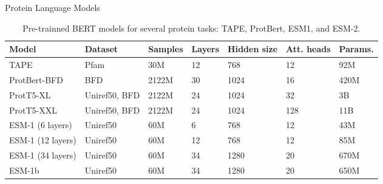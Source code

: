 \documentclass[10pt]{beamer}
\newcommand{\1}{
	\setbeamertemplate{background}{
		\texttt{[image: ../img/1]}
		\tikz[overlay] \fill[fill opacity=0.75,fill=white] (0,0) rectangle (-\paperwidth,\paperheight);
	}
}
\begin{document}
\begin{frame}{Protein Language Models}{}	
	\begin{table}[h]%
		\centering
		\scriptsize
		\caption{Pre-trainned BERT models for several protein tasks: TAPE, ProtBert, ESM1, and ESM-2.}%
		
		\label{tab:pretrained}
		
		\setlength{\tabcolsep}{0.5em} %
		{\renewcommand{\arraystretch}{1.1}%
			\scriptsize
			\begin{tabular}{lllllll}
				
				\textbf{Model}   & \textbf{Dataset} & \textbf{Samples} & \textbf{Layers} & \textbf{Hidden size} & \textbf{Att. heads} & \textbf{Params.} \\ \hline
				
				TAPE             & Pfam             & 30M                   & 12              & 768                  & 12                       & 92M                 \\
				ProtBert-BFD     & BFD              & 2122M                 & 30              & 1024                 & 16                       & 420M                \\
				
				ProtT5-XL     & Uniref50, BFD              & 2122M                 & 24              & 1024                 & 32                       & 3B                \\
				
				ProtT5-XXL     & Uniref50, BFD              & 2122M                 & 24              & 1024                 & 128                       & 11B                \\
				
				
				
				ESM-1 (6 layers)  & Uniref50         & 60M                   & 6               & 768                  & 12                       & 43M                  \\
				ESM-1 (12 layers)  & Uniref50         & 60M                   & 12               & 768                  & 12                       & 85M                  \\
				ESM-1 (34 layers)  & Uniref50         & 60M                   & 34               & 1280                  & 20                       & 670M                  \\
				ESM-1b  & Uniref50         & 60M                   & 34               & 1280                  & 20                       & 650M                  \\
				

\end{tabular}}
\end{table}
\end{frame}
\end{document}

